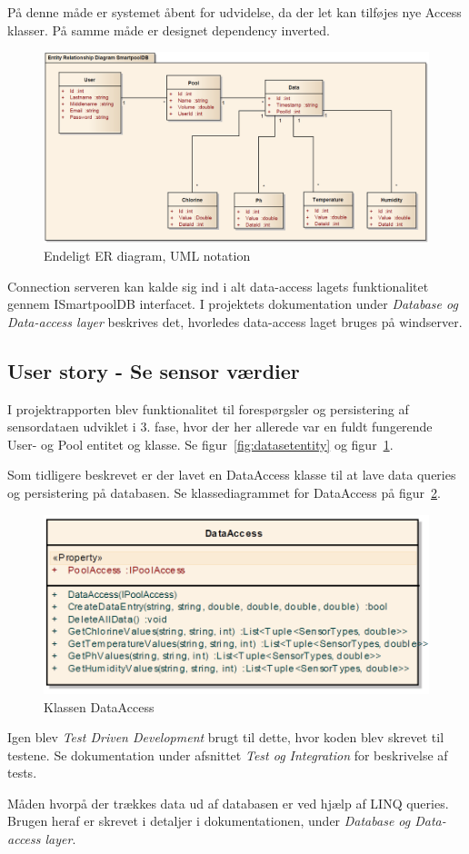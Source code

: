 På denne måde er systemet åbent for udvidelse, da der let kan tilføjes nye Access klasser. På samme måde er designet dependency inverted.

\begin{figure}[h]
	\centering
	\includegraphics[width=\linewidth]{figs/design/databaseERD_final_uml}
	\caption{Endeligt ER diagram, UML notation}
	\label{fig:databaseERD_final_uml}
\end{figure}

Connection serveren kan kalde sig ind i alt data-access lagets funktionalitet gennem ISmartpoolDB interfacet. I projektets dokumentation under \textit{Database og Data-access layer} beskrives det, hvorledes data-access laget bruges på \gls{windserver}.

\subsection{User story - Se sensor værdier}

I projektrapporten blev funktionalitet til forespørgsler og persistering af sensordataen udviklet i 3. fase, hvor der her allerede var en fuldt fungerende User- og Pool entitet og klasse. Se figur~\ref{fig:datasetentity} og figur~\ref{fig:databaseERD_final_uml}.

Som tidligere beskrevet er der lavet en DataAccess klasse til at lave data queries og persistering på databasen. Se klassediagrammet for DataAccess på figur~\ref{fig:dataAccess}.
	
\begin{figure}[h]
\centering
\includegraphics[width=0.7\linewidth]{figs/database/dataAccess}
\caption{Klassen DataAccess}
\label{fig:dataAccess}
\end{figure}

Igen blev \textit{Test Driven Development} brugt til dette, hvor koden blev skrevet til testene. Se dokumentation under afsnittet \textit{Test og Integration} for beskrivelse af tests.

Måden hvorpå der trækkes data ud af databasen er ved hjælp af LINQ queries. Brugen heraf er skrevet i detaljer i dokumentationen, under \textit{Database og Data-access layer}.